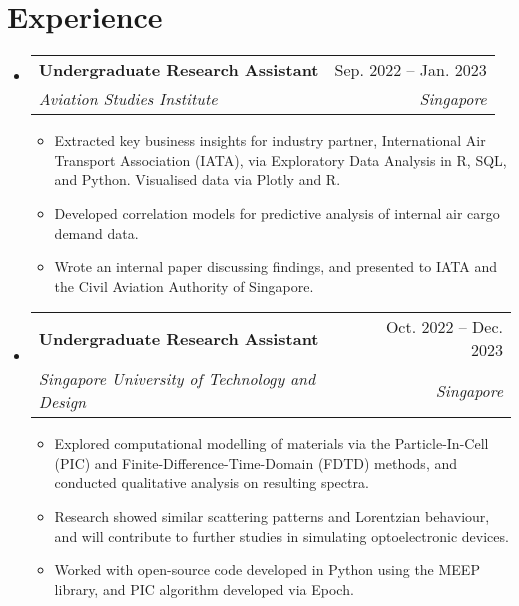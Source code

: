 \documentclass[letterpaper,11pt]{article}
\makeatletter
\newcommand{\resumeItem}[1]{
  \item\small{
    {#1 \vspace{-2pt}}
  }
}
\newcommand{\resumeSubheading}[4]{
  \vspace{-2pt}\item
    \begin{tabular*}{1.0\textwidth}[t]{l@{\extracolsep{\fill}}r}
      \textbf{#1} & \small #2 \\
      \textit{\small#3} & \textit{\small #4} \\
    \end{tabular*}\vspace{-7pt}
}
\newcommand{\resumeSubHeadingListStart}{\begin{itemize}[leftmargin=0.0in, label={}]}
\newcommand{\resumeSubHeadingListEnd}{\end{itemize}}
\newcommand{\resumeItemListStart}{\begin{itemize}}
\newcommand{\resumeItemListEnd}{\end{itemize}\vspace{-5pt}}
\makeatother
\begin{document}
\section{Experience}
  \resumeSubHeadingListStart
    \resumeSubheading
      {Undergraduate Research Assistant}{Sep. 2022 -- Jan. 2023}
      {Aviation Studies Institute}{Singapore}
      \resumeItemListStart
        \resumeItem{Extracted key business insights for industry partner, International Air Transport Association (IATA), via Exploratory Data Analysis in R, SQL, and Python. Visualised data via Plotly and R.}
        \resumeItem{Developed correlation models for predictive analysis of internal air cargo demand data.}
        \resumeItem{Wrote an internal paper discussing findings, and presented to IATA and the Civil Aviation Authority of Singapore.}
      \resumeItemListEnd

    \resumeSubheading
      {Undergraduate Research Assistant}{Oct. 2022 -- Dec. 2023}
      {Singapore University of Technology and Design}{Singapore}
      \resumeItemListStart
        \resumeItem{Explored computational modelling of materials via the Particle-In-Cell (PIC) and Finite-Difference-Time-Domain (FDTD) methods, and conducted qualitative analysis on resulting spectra.}
        \resumeItem{Research showed similar scattering patterns and Lorentzian behaviour, and will contribute to further studies in simulating optoelectronic devices.}
        \resumeItem{Worked with open-source code developed in Python using the MEEP library, and PIC algorithm developed via Epoch.}
    \resumeItemListEnd

    
  \resumeSubHeadingListEnd
\end{document}
